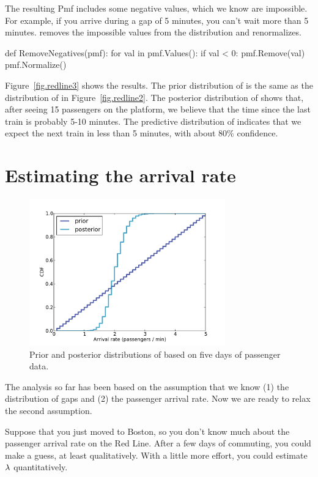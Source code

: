 \documentclass[12pt]{book}
\theoremstyle{exercise}
\begin{document}
The resulting Pmf includes some negative values, which we know are
impossible.  For example, if you arrive during a gap of 5 minutes, you
can't wait more than 5 minutes.   removes the
impossible values from the distribution and renormalizes.

\begin{code}
def RemoveNegatives(pmf):
    for val in pmf.Values():
        if val < 0:
            pmf.Remove(val)
    pmf.Normalize()
\end{code}

Figure~\ref{fig.redline3} shows the results.  The prior distribution
of  is the same as the distribution of  in
Figure~\ref{fig.redline2}.  The posterior distribution of 
shows that, after seeing 15 passengers on the platform, we believe
that the time since the last train is probably 5-10 minutes.  The
predictive distribution of  indicates that we expect the next
train in less than 5 minutes, with about 80\% confidence.


\section{Estimating the arrival rate}

\begin{figure}
\centerline{\includegraphics[height=2.5in]{figs/redline1.pdf}}
\caption{Prior and posterior distributions of  based
on five days of passenger data. }
\label{fig.redline1}
\end{figure}

The analysis so far has been based on the assumption that we know (1)
the distribution of gaps and (2) the passenger arrival rate.  Now we
are ready to relax the second assumption.

Suppose that you just moved to Boston, so you don't know much about
the passenger arrival rate on the Red Line.  After a few days of
commuting, you could make a guess, at least qualitatively.  With
a little more effort, you could estimate $\mathtt{\lambda}$ quantitatively.
\end{document}
